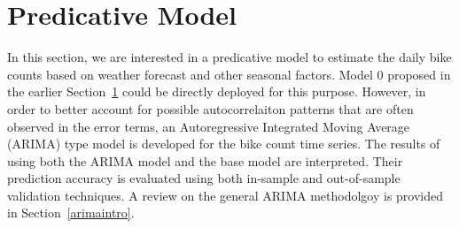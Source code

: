 \documentclass [11pt, proquest] {uwthesis}[2015/03/03]
\begin{document}
%
%

\newpage
\thispagestyle{empty}
\mbox{}



\section{Predicative Model}

In this section, we are interested in a predicative model to estimate the daily bike counts based on weather forecast and other seasonal factors. Model 0 proposed in the earlier Section~\ref{} could be directly deployed for this purpose. However, in order to better account for possible autocorrelaiton patterns that are often observed in the error terms, an Autoregressive Integrated Moving Average (ARIMA) type model is developed for the bike count time series. The results of using both the ARIMA model and the base model are interpreted. Their prediction accuracy is evaluated using both in-sample and out-of-sample validation techniques. A review on the general ARIMA methodolgoy is provided in Section~\ref{arimaintro}.
\end{document}
